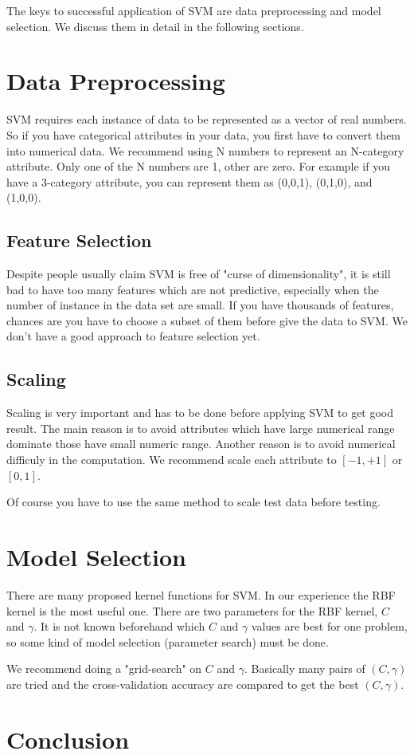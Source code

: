 \documentclass[12pt]{article}
\begin{document}
The keys to successful application of SVM are 
data preprocessing and model selection. 
We discuss them in detail in the following 
sections.

\section{Data Preprocessing}

SVM requires each instance of data to be represented
as a vector of real numbers. So if you have categorical
attributes in your data, you first have to convert 
them into numerical data. We recommend using N numbers to 
represent an N-category attribute. Only one of the N
numbers are 1, other are zero. For example if you have
a 3-category attribute, you can represent them as (0,0,1),
(0,1,0), and (1,0,0).

\subsection{Feature Selection}

Despite people usually claim SVM is free of 
"curse of dimensionality", it is still bad to 
have too many features which are not predictive, 
especially when the number of instance in the
data set are small. If you have thousands of
features, chances are you have to choose a 
subset of them before give the data to SVM.
We don't have a good approach to feature 
selection yet.

\subsection{Scaling}

Scaling is very important and has to be done 
before applying SVM to get good result. The 
main reason is to avoid attributes which have 
large numerical range dominate those have 
small numeric range. Another reason is to 
avoid numerical difficuly in the computation. 
We recommend scale each attribute to 
$[-1,+1]$ or $[0,1]$.

Of course you have to use the same method to 
scale test data before testing.

\section{Model Selection}

There are many proposed kernel functions for 
SVM. In our experience the RBF kernel is the 
most useful one. There are two parameters
for the RBF kernel, $C$ and $\gamma$. It 
is not known beforehand which $C$ and $\gamma$
values are best for one problem, so some kind of
model selection (parameter search) must be done. 

We recommend doing a "grid-search" on $C$ and
$\gamma$. Basically many pairs of $(C,\gamma)$ 
are tried and the cross-validation accuracy are 
compared to get the best $(C,\gamma)$.

\section{Conclusion}
\end{document}
